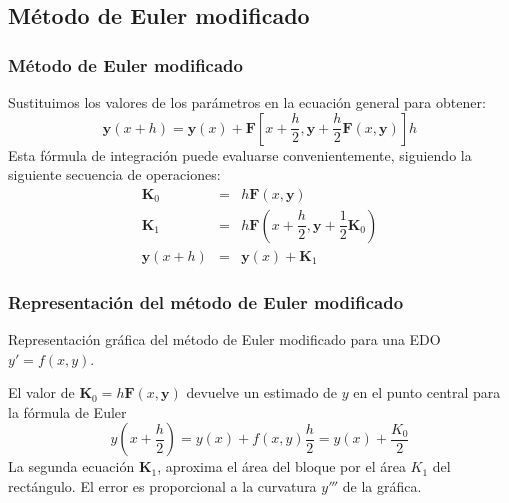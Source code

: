 \subsection{Método de Euler modificado}
\begin{frame}
\frametitle{Método de Euler modificado}
Sustituimos los valores de los parámetros en la ecuación general para obtener:
\[ \mathbf{y}(x+h) = \mathbf{y}(x) + \mathbf{F} \left[  x + \dfrac{h}{2}, \mathbf{y} + \dfrac{h}{2} \mathbf{F}(x,\mathbf{y}) \right] h\]
Esta fórmula de integración puede evaluarse convenientemente, siguiendo la siguiente secuencia de operaciones:
\begin{eqnarray*}
\mathbf{K}_{0} &=& h \mathbf{F}(x,\mathbf{y}) \\
\mathbf{K}_{1} &=& h \mathbf{F} \left( x+\dfrac{h}{2},\mathbf{y}+\dfrac{1}{2} \mathbf{K}_{0} \right) \\
\mathbf{y}(x+h) &=& \mathbf{y}(x) + \mathbf{K}_{1}
\end{eqnarray*}
\end{frame}
\begin{frame}
\frametitle{Representación del método de Euler modificado}
\begin{center}
\end{center}
Representación gráfica del método de Euler modificado para una EDO $y'=f(x,y)$.
\end{frame}
\begin{frame}
El valor de $\mathbf{K}_{0}= h \mathbf{F}(x,\mathbf{y})$ devuelve un estimado de $y$ en el punto central para la fórmula de Euler
\[ y(x+\frac{h}{2}) = y(x) + f(x,y) \frac{h}{2} = y(x) + \frac{K_{0}}{2}\]
La segunda ecuación $\mathbf{K}_{1}$, aproxima el área del bloque por el área $K_{1}$ del rectángulo. El error es proporcional a la curvatura $y'''$ de la gráfica.
\end{frame}
